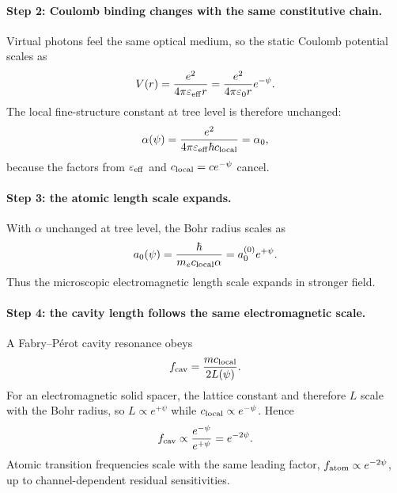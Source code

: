 \paragraph{Step 2: Coulomb binding changes with the same constitutive chain.}
Virtual photons feel the same optical medium, so the static Coulomb potential scales as
\begin{equation}\label{eq:coulomb-psi}
V(r)=\frac{e^2}{4\pi\varepsilon_{\rm eff}r}
=\frac{e^2}{4\pi\varepsilon_0 r}e^{-\psi}.
\end{equation}
The local fine-structure constant at tree level is therefore unchanged:
\begin{equation}\label{eq:alpha-tree-cancel}
\alpha(\psi)=\frac{e^2}{4\pi\varepsilon_{\rm eff}\hbar c_{\rm local}}
=\alpha_0,
\end{equation}
because the factors from $\varepsilon_{\rm eff}$ and $c_{\rm local}=ce^{-\psi}$ cancel.

\paragraph{Step 3: the atomic length scale expands.}
With $\alpha$ unchanged at tree level, the Bohr radius scales as
\begin{equation}\label{eq:bohr-psi}
a_0(\psi)=\frac{\hbar}{m_ec_{\rm local}\alpha}=a_0^{(0)}e^{+\psi}.
\end{equation}
Thus the microscopic electromagnetic length scale expands in stronger field.

\paragraph{Step 4: the cavity length follows the same electromagnetic scale.}
A Fabry--P\'erot cavity resonance obeys
\begin{equation}
f_{\rm cav}=\frac{mc_{\rm local}}{2L(\psi)}.
\end{equation}
For an electromagnetic solid spacer, the lattice constant and therefore $L$ scale with the Bohr radius, so $L\propto e^{+\psi}$ while $c_{\rm local}\propto e^{-\psi}$.  Hence
\begin{equation}\label{eq:fcav-psi}
f_{\rm cav}\propto \frac{e^{-\psi}}{e^{+\psi}}=e^{-2\psi}.
\end{equation}
Atomic transition frequencies scale with the same leading factor, $f_{\rm atom}\propto e^{-2\psi}$, up to channel-dependent residual sensitivities.

